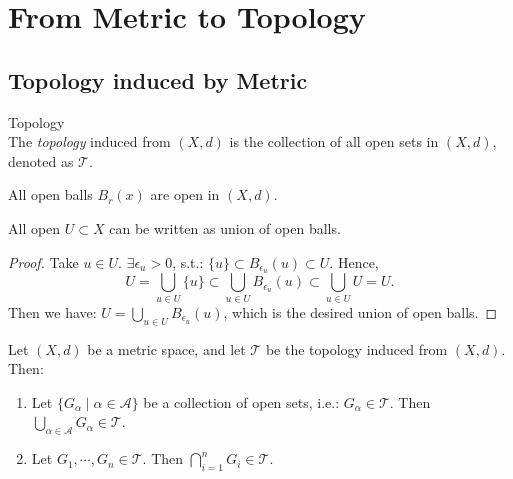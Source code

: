 \chapter{From Metric to Topology}

\section{Topology induced by Metric}

\begin{definition}{Topology}\\
The \textit{topology} induced from $(X,d)$ is the collection of all open sets in $(X,d)$, denoted as $\mathcal{T}$.
\end{definition}

\begin{proposition}
    All open balls $B_r(x)$ are open in $(X,d)$.
\end{proposition}

\begin{proposition}
    All open $U \subset X$ can be written as union of open balls.
\end{proposition}

\begin{proof}
    Take $u \in U$. $\exists\epsilon_{u}>0$, s.t.: $\{u\} \subset B_{\epsilon_u} (u)\subset U$. Hence, 
    $$U=\bigcup_{u\in U}\{u\} \subset \bigcup_{u\in U}B_{\epsilon_u}(u) \subset \bigcup_{u\in U}U=U.$$
    Then we have: $U=\bigcup_{u\in U}B_{\epsilon_u}(u)$, which is the desired union of open balls.
\end{proof}

\begin{proposition}
    Let $(X,d)$ be a metric space, and let $\mathcal{T}$ be the topology induced from $(X,d)$. Then:
    \begin{enumerate}
        \item Let $\{G_\alpha \mid \alpha \in \mathcal{A}\}$ be a collection of open sets, i.e.: $G_\alpha \in \mathcal{T}$. Then $\bigcup_{\alpha \in \mathcal{A}} G_\alpha \in \mathcal{T}$.
        \item Let $G_1, \cdots, G_n \in \mathcal{T}$. Then $\bigcap_{i=1}^nG_i \in \mathcal{T}$.
    \end{enumerate}
\end{proposition}

